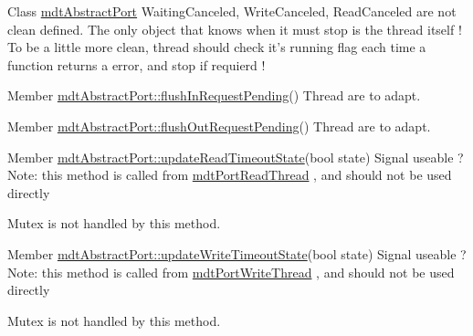 \label{todo__todo000012}
\hypertarget{todo__todo000012}{}
 
\begin{DoxyDescription}
\item[Class \hyperlink{classmdt_abstract_port}{mdtAbstractPort} ]WaitingCanceled, WriteCanceled, ReadCanceled are not clean defined. The only object that knows when it must stop is the thread itself ! To be a little more clean, thread should check it's running flag each time a function returns a error, and stop if requierd ! 
\end{DoxyDescription}

\label{todo__todo000013}
\hypertarget{todo__todo000013}{}
 
\begin{DoxyDescription}
\item[Member \hyperlink{classmdt_abstract_port_a54b7bfb725c91b2c292a39275b877207}{mdtAbstractPort::flushInRequestPending}() ]Thread are to adapt. 
\end{DoxyDescription}

\label{todo__todo000014}
\hypertarget{todo__todo000014}{}
 
\begin{DoxyDescription}
\item[Member \hyperlink{classmdt_abstract_port_a2cc79d9288bebafaa183753dcf0807f3}{mdtAbstractPort::flushOutRequestPending}() ]Thread are to adapt. 
\end{DoxyDescription}

\label{todo__todo000015}
\hypertarget{todo__todo000015}{}
 
\begin{DoxyDescription}
\item[Member \hyperlink{classmdt_abstract_port_a0fc7317e988d5dea53a999cd1bf4faa9}{mdtAbstractPort::updateReadTimeoutState}(bool state) ]Signal useable ? Note: this method is called from \hyperlink{classmdt_port_read_thread}{mdtPortReadThread} , and should not be used directly\par
 Mutex is not handled by this method. 
\end{DoxyDescription}

\label{todo__todo000016}
\hypertarget{todo__todo000016}{}
 
\begin{DoxyDescription}
\item[Member \hyperlink{classmdt_abstract_port_ab51135de1f7bbc4707c3284f924c98dc}{mdtAbstractPort::updateWriteTimeoutState}(bool state) ]Signal useable ? Note: this method is called from \hyperlink{classmdt_port_write_thread}{mdtPortWriteThread} , and should not be used directly\par
 Mutex is not handled by this method. 
\end{DoxyDescription}

